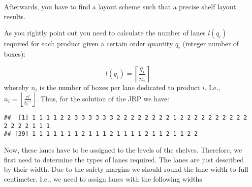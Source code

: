 \documentclass[
]{article}
\newenvironment{Shaded}{\begin{snugshade}}{\end{snugshade}}
\newcommand{\CommentTok}[1]{\textcolor[rgb]{0.56,0.35,0.01}{\textit{#1}}}
\newcommand{\DecValTok}[1]{\textcolor[rgb]{0.00,0.00,0.81}{#1}}
\newcommand{\KeywordTok}[1]{\textcolor[rgb]{0.13,0.29,0.53}{\textbf{#1}}}
\newcommand{\NormalTok}[1]{#1}
\newcommand{\OperatorTok}[1]{\textcolor[rgb]{0.81,0.36,0.00}{\textbf{#1}}}
\newcommand{\StringTok}[1]{\textcolor[rgb]{0.31,0.60,0.02}{#1}}
\begin{document}
\begin{Shaded}
\end{Shaded}

Afterwards, you have to find a layout scheme such that a precise shelf
layout results.

As you rightly point out you need to calculate the number of lanes
\(l(q_i)\) required for each product given a certain order quantity
\(q_i\) (integer number of boxes):

\[l(q_i) =\left\lceil \frac{q_i}{n_i} \right\rceil\] whereby \(n_i\) is
the number of boxes per lane dedicated to product \(i\). I.e.,
\(n_i = \left\lfloor \frac{rl}{b_i^{-1}} \right\rfloor\). Thus, for the
solution of the JRP we have:

\begin{Shaded}
\end{Shaded}

\begin{verbatim}
##  [1] 1 1 1 1 2 2 3 3 3 3 3 3 2 2 2 2 2 2 2 2 1 2 2 2 2 2 2 2 2 2 2 2 2 2 2 1 1 1
## [39] 1 1 1 1 1 1 1 2 1 1 1 2 1 1 1 1 2 1 1 2 1 1 2 2
\end{verbatim}

Now, these lanes have to be assigned to the levels of the shelves.
Therefore, we first need to determine the types of lanes required. The
lanes are just described by their width. Due to the safety margins we
should round the lane width to full centimeter. I.e., we need to assign
lanes with the following widths

\begin{Shaded}
\end{Shaded}
\end{document}
